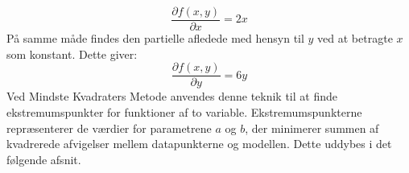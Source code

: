 \begin{equation*}\frac{\partial f(x,y)}{\partial x} = 2x\end{equation*}
På samme måde findes den partielle afledede med hensyn til $y$ ved at betragte $x$ som konstant. Dette giver:
\begin{equation*}\frac{\partial f(x,y)}{\partial y} = 6y\end{equation*}
Ved Mindste Kvadraters Metode anvendes denne teknik til at finde ekstremumspunkter for funktioner af to variable. Ekstremumspunkterne repræsenterer de værdier for parametrene $a$ og $b$, der minimerer summen af kvadrerede afvigelser mellem datapunkterne og modellen. Dette uddybes i det følgende afsnit.


\newpage
